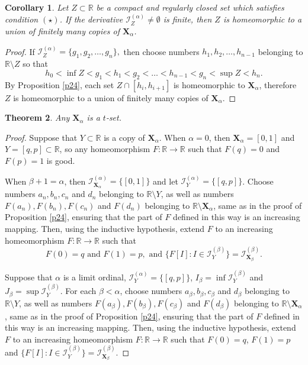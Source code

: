\documentclass[12pt,a4paper,leqno]{amsart}
\newtheorem{thm}{Theorem}
\newtheorem{cor}[thm]{Corollary}
\theoremstyle{definition}
\begin{document}
\begin{cor} \label{c24} Let  $Z\subset \mathbb R$ be a compact and   regularly closed set which satisfies condition $(\star)$.  If the derivative  $\mathcal I_Z^{(\alpha)}\not= \emptyset$ is finite, then $Z$ is homeomorphic to a union of finitely many copies of ${\mathbf X}_\alpha$. \end{cor}

\begin{proof} If $\mathcal I_Z^{(\alpha)} = \{g_1,g_2, \ldots, g_n\},$ then 
choose numbers $h_1, h_2, \ldots , h_{n-1}$  belonging to $ \mathbb R \setminus Z$ so that $$h_0< \inf Z< g_1 < h_1 < g_2 < \ldots < h_{n-1} < g_n < \sup Z< h_n.$$  By Proposition \ref{p24}, each set $Z\cap [h_i,h_{i+1}]$ is homeomorphic to  $\textbf{X}_\alpha$, therefore $Z$ is homeomorphic to a union of finitely many copies of ${\mathbf X}_\alpha$.
	\end{proof}


\begin{thm}\label{t25} Any $\mathbf{X}_\alpha$ is  a $t$-set.  
 \end{thm} 
\begin{proof} Suppose that $Y\subset \mathbb R$ is a copy of $\textbf{X}_\alpha$.
When $\alpha =0$, then $\textbf{X}_\alpha =[0,1]$ and $Y=[q,p] \subset \mathbb R$, so  any homeomorphism $F\colon \mathbb R \to \mathbb R$ such that $F(q)=0$ and $F(p)=1$ is good. 

When $\beta +1 = \alpha$, then $\mathcal I^{(\alpha)}_{\textbf{X}_\alpha} = \{[0,1]\}$ and let $\mathcal I^{(\alpha)}_{Y} = \{[q,p]\}$. Choose numbers $a_n, b_n, c_n$ and $d_n$  belonging to $\mathbb R\setminus Y$, as well as numbers $F(a_n), F(b_n), F(c_n)$ and $F(d_n)$  belonging to $\mathbb R\setminus \textbf{X}_\alpha$, same as in the proof of Proposition \ref{p24}, ensuring that the part of $F$ defined in this way is an increasing mapping.
  Then, using the inductive hypothesis,  extend $F$ to an increasing homeomorphism $F\colon \mathbb R \to \mathbb R$ such that
$$F(0)=q \mbox{ and }  F(1)=p, \mbox{ and } \{ F[I]\colon I \in \mathcal I^{(\beta)}_Y \} = \mathcal I^{(\beta)}_{\textbf{X}_\beta}.$$

Suppose that  $\alpha$ is a  limit ordinal,    $\mathcal I^{(\alpha)}_{Y} = \{[q,p]\}$,   $ I_\beta= \inf \mathcal I^{(\beta)}_Y$ and $ J_\beta= \sup \mathcal I^{(\beta)}_Y$.  For each $\beta < \alpha$, 
choose numbers $a_\beta, b_\beta, c_\beta$ and $d_\beta$  belonging to $\mathbb R\setminus Y$, as well as numbers $F(a_\beta), F(b_\beta), F(c_\beta)$ and $F(d_\beta)$  belonging to $\mathbb R\setminus \textbf{X}_\alpha$, same as in the proof of Proposition \ref{p24}, ensuring that the part of $F$ defined in this way is an increasing mapping.
  Then, using the inductive hypothesis,  extend $F$ to an increasing homeomorphism $F\colon \mathbb R \to \mathbb R$ such that
$F(0)=q$,  $F(1)=p$ and $\{ F[I]\colon I \in \mathcal I^{(\beta)}_Y \} = \mathcal I^{(\beta)}_{\textbf{X}_\beta}.$
  \end{proof}
	
\end{document}
